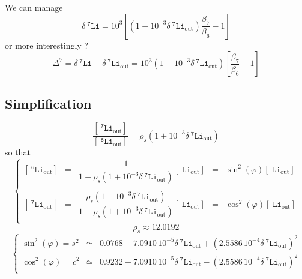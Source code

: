 \documentclass[aps,onecolumn,12pt]{revtex4}
\newcommand{\mychem}[1]{\mathtt{#1}}
\newcommand{\myconc}[1]{\left\lbrack{#1}\right\rbrack}
\newcommand{\spLi}[1]{{~^{\mychem{#1}}\mychem{Li}}}
\newcommand{\spLiOut}[1]{{\spLi{#1}}_{\mathrm{out}}}
\newcommand{\LiOut}[1]{\myconc{\spLiOut{#1}}}
\newcommand{\deltaLi}{ {\delta\!\!\!\spLi{7}} }
\newcommand{\deltaLiOut}{{\deltaLi}_{\mathrm{out}}}
\begin{document}
We can manage
\begin{equation}
	\deltaLi = 10^3 \left[ \left(1+10^{-3}\deltaLiOut\right)\dfrac{\beta_7}{\beta_6} - 1 \right] 
\end{equation}
or more interestingly ?
\begin{equation}
	\Delta^7 = \deltaLi - \deltaLiOut = 10^3 \left(1+10^{-3}\deltaLiOut\right) \left[\dfrac{\beta_7}{\beta_6} - 1\right]
\end{equation}

\subsection{Simplification}
\begin{equation}
	\dfrac{\LiOut{7}}{\LiOut{6}} = \rho_s \left(1+10^{-3}\deltaLiOut\right)
\end{equation}
so that
\begin{equation}
\left\lbrace
	\begin{array}{rclcl}
	\LiOut{6} & = & \dfrac{1}{1+\rho_s\left(1+10^{-3}\deltaLiOut\right)} \LiOut{} & = & \sin^2(\varphi) \LiOut{} \\
	\\
	\LiOut{7} & = & \dfrac{\rho_s\left(1+10^{-3}\deltaLiOut\right)}{1+\rho_s\left(1+10^{-3}\deltaLiOut\right)} \LiOut{} & = & \cos^2(\varphi)\LiOut{} \\
	\end{array}
\right.
\end{equation}
$$
	\rho_s \approx 12.0192
$$
\begin{equation}
\left\lbrace
	\begin{array}{rcl}
	\sin^2(\varphi) = s^2 & \simeq & 0.0768 - 7.0910\,10^{-5} \deltaLiOut + \left(2.5586\,10^{-4}\deltaLiOut\right)^2\\
	\cos^2(\varphi) = c^2 & \simeq & 0.9232 + 7.0910\,10^{-5} \deltaLiOut - \left(2.5586\,10^{-4}\deltaLiOut\right)^2\\
	\end{array}
\right.
\end{equation}
\end{document}
